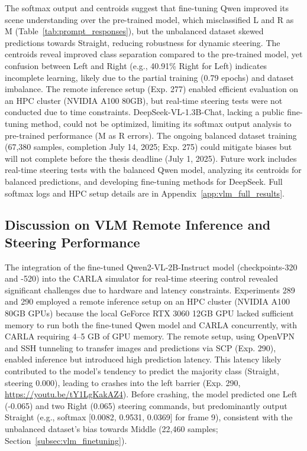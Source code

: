 The softmax output and centroids suggest that fine-tuning Qwen improved its scene understanding over the pre-trained model, which misclassified L and R as M (Table~\ref{tab:prompt_responses}), but the unbalanced dataset skewed predictions towards Straight, reducing robustness for dynamic steering. The centroids reveal improved class separation compared to the pre-trained model, yet confusion between Left and Right (e.g., 40.91\% Right for Left) indicates incomplete learning, likely due to the partial training (0.79 epochs) and dataset imbalance. The remote inference setup (Exp. 277) enabled efficient evaluation on an HPC cluster (NVIDIA A100 80GB), but real-time steering tests were not conducted due to time constraints. DeepSeek-VL-1.3B-Chat, lacking a public fine-tuning method, could not be optimized, limiting its softmax output analysis to pre-trained performance (M as R errors). The ongoing balanced dataset training (67,380 samples, completion July 14, 2025; Exp. 275) could mitigate biases but will not complete before the thesis deadline (July 1, 2025). Future work includes real-time steering tests with the balanced Qwen model, analyzing its centroids for balanced predictions, and developing fine-tuning methods for DeepSeek. Full softmax logs and HPC setup details are in Appendix~\ref{app:vlm_full_results}.


\subsection{Discussion on VLM Remote Inference and Steering Performance}
\label{subsec:vlm_remote_inference}

The integration of the fine-tuned Qwen2-VL-2B-Instruct model (checkpoints-320 and -520) into the CARLA simulator \cite{Dosovitskiy2017} for real-time steering control revealed significant challenges due to hardware and latency constraints. Experiments 289 and 290 employed a remote inference setup on an HPC cluster (NVIDIA A100 80GB GPUs) because the local GeForce RTX 3060 12GB GPU lacked sufficient memory to run both the fine-tuned Qwen model and CARLA concurrently, with CARLA requiring 4--5 GB of GPU memory. The remote setup, using OpenVPN and SSH tunneling to transfer images and predictions via SCP (Exp. 290), enabled inference but introduced high prediction latency. This latency likely contributed to the model’s tendency to predict the majority class (Straight, steering 0.000), leading to crashes into the left barrier (Exp. 290, \url{https://youtu.be/tY1LgKakAZ4}). Before crashing, the model predicted one Left (-0.065) and two Right (0.065) steering commands, but predominantly output Straight (e.g., softmax [0.0082, 0.9531, 0.0369] for frame 9), consistent with the unbalanced dataset’s bias towards Middle (22,460 samples; Section~\ref{subsec:vlm_finetuning}).


